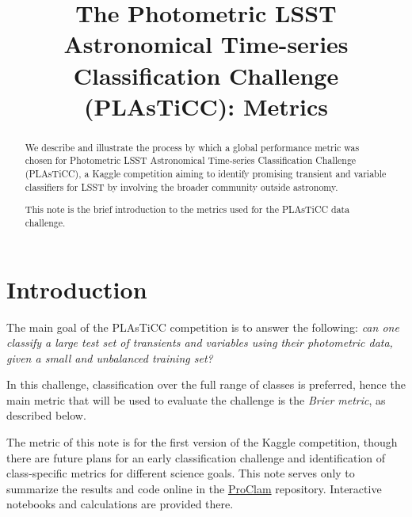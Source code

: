 \documentclass[\docopts]{\docclass}
\begin{document}
\title{The Photometric LSST Astronomical Time-series Classification Challenge (PLAsTiCC): Metrics}

\maketitlepre

\begin{abstract}
We describe and illustrate the process by which a global performance metric was chosen for Photometric LSST Astronomical Time-series Classification Challenge (PLAsTiCC), a Kaggle competition aiming to identify promising transient and variable classifiers for LSST by involving the broader community outside astronomy.

This note is the brief introduction to the metrics used for the PLAsTiCC data challenge.
\end{abstract}

\dockeys{}

\maketitlepost


\section{Introduction}
\label{sec:intro}

The main goal of the PLAsTiCC competition is to answer the following: \textit{can one classify a large test set of transients and variables using their photometric data, given a small and unbalanced training set?}

In this challenge, classification over the full range of classes is preferred, hence the main metric that will be used to evaluate the challenge is the \textit{Brier metric}, as described below.
 
The metric of this note is for the first version of the Kaggle competition, though there are future plans for an early classification challenge and identification of class-specific metrics for different science goals. This note serves only to summarize the results and code online in the \href{https://github.com/aimalz/proclam/}{ProClam} repository. Interactive notebooks and calculations are provided there.
\end{document}
